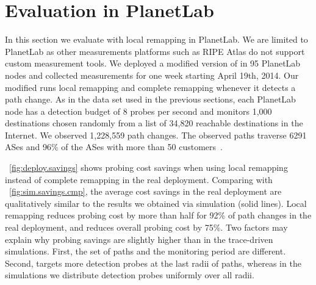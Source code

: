 \section{Evaluation in PlanetLab}
\label{sec:deploy}

In this section we evaluate \dtrack{} with local remapping in PlanetLab.
We are limited to PlanetLab as other measurements platforms such
as RIPE Atlas do not support custom measurement tools.  We deployed a
modified version of \dtrack{} in 95 PlanetLab nodes and collected
measurements for one week starting April 19th, 2014.  Our modified
\dtrack{} runs local remapping and complete remapping whenever it
detects a path change.  As in the data set used in the previous
sections, each PlanetLab node has a detection budget of 8 probes per
second and monitors 1,000 destinations chosen randomly from a list of
34,820 reachable destinations in the Internet.  We observed 1,228,559
path changes.  The observed paths traverse 6291 ASes and 96\% of the
ASes with more than 50 customers~\cite{luckie13asrel}.

\figstr~\ref{fig:deploy.savings} shows probing cost savings when using
local remapping instead of complete remapping in the real deployment.
Comparing with \figstr~\ref{fig:sim.savings.cmp}, the average cost
savings in the real deployment are qualitatively similar to the results
we obtained via simulation (solid lines).  Local remapping reduces
probing cost by more than half for 92\% of path changes in the real
deployment, and reduces overall probing cost by 75\%.  Two factors may
explain why probing savings are slightly higher than in the trace-driven
simulations.  First, the set of paths and the monitoring period are
different.  Second, \dtrack{} targets more detection probes at the last
radii of paths, whereas in the simulations we distribute detection
probes uniformly over all radii.


%
%


